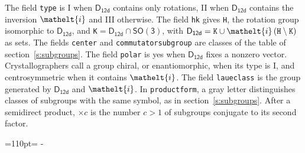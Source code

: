 \documentclass[10pt,a4paper]{article}
\newcommand{\needspace}[1]{\par\penalty-100\begingroup\dimen0=#1\relax\dimen2=\pagegoal
  \advance\dimen2-\pagetotal\ifdim\dimen0>\dimen2\relax\ifdim\dimen2>0pt\vfil\break\fi\fi
  \endgroup}
\numberwithin{equation}{section}
\newcommand{\eltfont}[1]{{\let\sigma\eltsigma\mathelt{#1}}}
\newcommand{\grp}[1]{\mathsf{#1}}
\newcommand{\elt}[1]{\eltfont{#1}}
\begin{document}
\leavevmode\label{n:element.inversion}The field \texttt{type} is I when $\grp{D_{12d}}$ contains only rotations, II when $\grp{D_{12d}}$ contains the inversion $\elt{i}$ and III otherwise. The field \texttt{hk} gives \texttt{H}, the rotation group isomorphic to $\grp{D_{12d}}$, and \texttt{K}${} = \grp{D_{12d}} \cap \grp{SO(3)}$, with $\grp{D_{12d}} = \texttt{K} \cup \elt{i}\,(\texttt{H} \setminus \texttt{K})$ as sets. The fields \texttt{center} and \texttt{commutatorsubgroup} are classes of the table of section~\ref{s:subgroups}. The field \texttt{polar} is yes when $\grp{D_{12d}}$ fixes a nonzero vector. Crystallographers call a group chiral, or enantiomorphic, when its type is I, and centrosymmetric when it contains $\elt{i}$. The field \texttt{laueclass} is the group generated by $\grp{D_{12d}}$ and $\elt{i}$.
In \texttt{productform}, a gray letter distinguishes classes of subgroups with the same symbol, as in section~\ref{s:subgroups}. \label{n:index.conjugates.c}After a semidirect product, ${\times}c$ is the number $c > 1$ of subgroups conjugate to its second factor.
\needspace{110pt}
\end{document}
